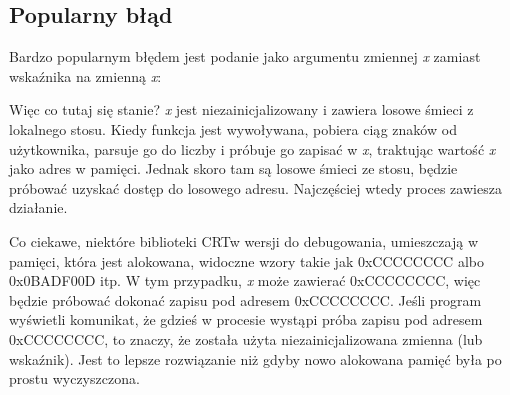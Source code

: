 \subsection{Popularny błąd}

Bardzo popularnym błędem jest podanie jako argumentu zmiennej \emph{x} zamiast wskaźnika na zmienną \emph{x}:



Więc co tutaj się stanie?
\emph{x} jest niezainicjalizowany i zawiera losowe śmieci z lokalnego stosu.
Kiedy funkcja \scanf jest wywoływana, pobiera ciąg znaków od użytkownika, parsuje go do liczby i próbuje go zapisać w \emph{x}, traktując wartość \emph{x} jako adres w pamięci.
Jednak skoro tam są losowe śmieci ze stosu, \scanf będzie próbować uzyskać dostęp do losowego adresu.
Najczęściej wtedy proces zawiesza działanie.

Co ciekawe, niektóre biblioteki \ac{CRT}w wersji do debugowania, umieszczają w pamięci, która jest alokowana, widoczne wzory takie jak  0xCCCCCCCC albo 0x0BADF00D itp.
W tym przypadku, \emph{x} może zawierać 0xCCCCCCCC, więc \scanf będzie próbować dokonać zapisu pod adresem 0xCCCCCCCC.
Jeśli program wyświetli komunikat, że gdzieś w procesie wystąpi próba zapisu pod adresem 0xCCCCCCCC, to znaczy, że
została użyta niezainicjalizowana zmienna (lub wskaźnik).
Jest to lepsze rozwiązanie niż gdyby nowo alokowana pamięć była po prostu wyczyszczona.
